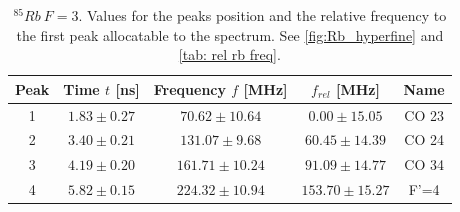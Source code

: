\documentclass[]{article}
\begin{document}
\begin{table}[H]
\centering
\begin{tabular}{|c|c|c|||c|c|}
\hline
Peak & Time $t$ [ns] & Frequency $f$ [MHz] & $f_{rel}$ [MHz] & Name \\ \hline\hline
1 & $1.83 \pm 0.27$  & $70.62 \pm 10.64$  & $0.00 \pm 15.05$  & CO 23 \\ \hline
2 & $3.40 \pm 0.21$  & $131.07 \pm 9.68$  & $60.45 \pm 14.39$  & CO 24 \\ \hline
3 & $4.19 \pm 0.20$  & $161.71 \pm 10.24$  & $91.09 \pm 14.77$  & CO 34 \\ \hline
4 & $5.82 \pm 0.15$  & $224.32 \pm 10.94$  & $153.70 \pm 15.27$  & F'=4 \\ \hline
\hline
\end{tabular}
\caption{$^{85}Rb\ F=3 $. Values for the peaks position and the relative frequency to the first peak allocatable to the spectrum. See \autoref{fig:Rb_hyperfine} and \autoref{tab: rel rb freq}.}
\end{table}


\newpage
\end{document}
